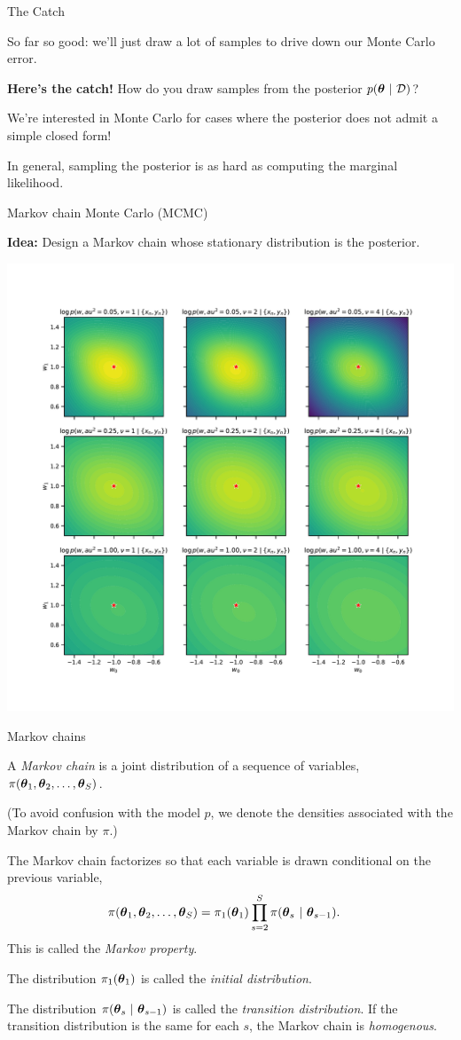 \documentclass[aspectratio=169]{beamer}
\begin{document}
\begin{frame}{The Catch}

So far so good: we'll just draw a lot of samples to drive down our Monte Carlo error. 

\textbf{Here's the catch!} How do you draw samples from the posterior $p(\boldsymbol{\theta} ~\vert~ \mathcal{D})$?

We're interested in Monte Carlo for cases where the posterior does not admit a simple closed form!

In general, sampling the posterior is as hard as computing the marginal likelihood. 

\end{frame}

\begin{frame}{Markov chain Monte Carlo (MCMC)}

\textbf{Idea:} Design a Markov chain whose stationary distribution is the posterior.
    
\centering
\includegraphics[width=.5\textwidth]{figures/lap3/robust_w_post.pdf}

\end{frame}

\begin{frame}{Markov chains}
    
A \emph{Markov chain} is a joint distribution of a sequence of variables, $\pi(\boldsymbol{\theta}_1, \boldsymbol{\theta}_2, \ldots, \boldsymbol{\theta}_S)$.

(To avoid confusion with the model $p$, we denote the densities associated with the Markov chain by $\pi$.)

The Markov chain factorizes so that each variable is drawn conditional on the previous variable,
\begin{align}
    \pi(\boldsymbol{\theta}_1, \boldsymbol{\theta}_2, \ldots, \boldsymbol{\theta}_S)
    &= 
    \pi_{1}(\boldsymbol{\theta}_1) \prod_{s=2}^S \pi(\boldsymbol{\theta}_s ~\vert~ \boldsymbol{\theta}_{s-1}).
\end{align}
This is called the \emph{Markov property}.

The distribution $\pi_1(\boldsymbol{\theta}_1)$ is called the \textit{initial distribution}.

The distribution $\pi(\boldsymbol{\theta}_s ~\vert~ \boldsymbol{\theta}_{s-1})$ is called the \textit{transition distribution}. If the transition distribution is the same for each $s$, the Markov chain is \textit{homogenous}.
\end{frame}
\end{document}
